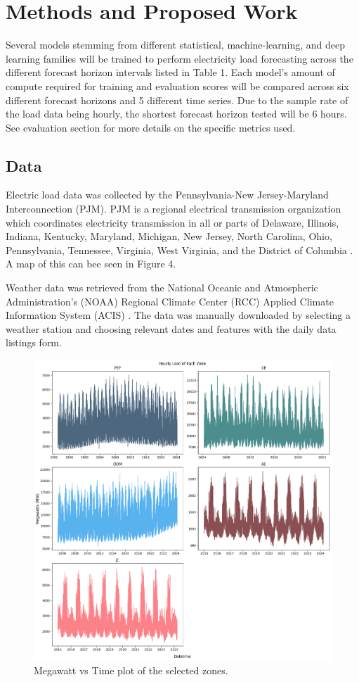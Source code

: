 \documentclass[sigconf]{acmart}
\begin{document}
\section{Methods and Proposed Work}
Several models stemming from different statistical, machine-learning, and deep learning families will be trained to perform electricity load forecasting across the different forecast horizon intervals listed in Table 1. Each model's amount of compute required for training and evaluation scores will be compared across six different forecast horizons and 5 different time series. Due to the sample rate of the load data being hourly, the shortest forecast horizon tested will be 6 hours. See evaluation section for more details on the specific metrics used.

  \subsection{Data}
  Electric load data was collected by the Pennsylvania-New Jersey-Maryland Interconnection (PJM). PJM is a regional electrical transmission organization which coordinates electricity transmission in all or parts of Delaware, Illinois, Indiana, Kentucky, Maryland, Michigan, New Jersey, North Carolina, Ohio, Pennsylvania, Tennessee, Virginia, West Virginia, and the District of Columbia \cite{PJMZone24}. A map of this can bee seen in Figure 4.
  
  Weather data was retrieved from the National Oceanic and Atmospheric Administration's (NOAA) Regional Climate Center (RCC) Applied Climate Information System (ACIS) \cite{ACIS}. The data was manually downloaded by selecting a weather station and choosing relevant dates and features with the daily data listings form. 
  
   \begin{figure}[hbt!]
    \includegraphics[width=\columnwidth]{Images/Zones_Overview.png}
    \caption{Megawatt vs Time plot of the selected zones.}
    \Description{}
    \label{fig:zone}
  \end{figure}
  
\end{document}
